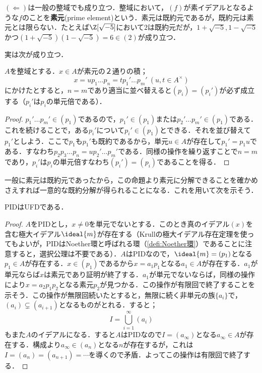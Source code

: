 $(\Longleftarrow)$は一般の整域でも成り立つ．整域において，$(f)$が素イデアルとなるような$f$のことを\textbf{素元}(prime element)という．素元は既約元であるが，既約元は素元とは限らない．たとえば$\Z[\sqrt{-5}]$において$2$は既約元だが，$1+\sqrt{-5},1-\sqrt{-5}$かつ$(1+\sqrt{-5})(1-\sqrt{-5})=6\in (2)$が成り立つ．

実は次が成り立つ．
\begin{prop}
	$A$を整域とする．$x\in A$が素元の２通りの積；
	\[x=up_1\dots p_n=tp_1'\dots p_m'~(u,t\in A^\times)\]
	にかけたとすると，$n=m$であり適当に並べ替えると$(p_i)=(p_i')$が必ず成立する（$p_i'$は$p_i$の単元倍である）．
\end{prop}

\begin{proof}
	$p_1'\dots p_m'\in (p_1)$であるので，$p_1'\in (p_1)$または$p_2'\dots p_m'\in (p_1)$である．これを続けることで，ある$p_i'$について$p_i'\in (p_1)$とできる．それを並び替えて$p_1'$としよう．ここで$p_1$も$p_1'$も既約であるから，単元$u\in A$が存在して$p_1'=p_1u$である．すなわち$p_2p_3\dots p_n=up_2'\dots p_m'$である．同様の操作を繰り返すことで$n=m$であり，$p_i'$は$p_i$の単元倍すなわち$(p_i')=(p_i)$であることを得る．
\end{proof}

一般に素元は既約元であったから，この命題より素元に分解できることを確かめさえすれば一意的な既約分解が得られることになる．これを用いて次を示そう．
\begin{thm}
	PIDはUFDである．
\end{thm}

\begin{proof}
	$A$をPIDとし，$x\neq0$を単元でないとする．このとき真のイデアル$(x)$を含む極大イデアル$\ideal{m}$が存在する（Krullの極大イデアル存在定理を使ってもよいが，PIDはNoether環と呼ばれる環（\ref{defi:Noether環}）であることに注意すると，選択公理は不要である）．$A$はPIDなので，$\ideal{m}=(p_1)$となる$p_1\in A$が存在する．$x\in(p_1)$であるから$x=a_1p_1$となる$a_1\in A$が存在する．$a_1$が単元ならば$x$は素元であり証明が終了する．$a_1$が単元でないならば，同様の操作により$x=a_2p_1p_2$となる素元$p_2$が見つかる．この操作が有限回で終了することを示そう．この操作が無限回続いたとすると，無限に続く非単元の族$\{a_i\}$で，$(a_i)\subsetneq (a_{i+1})$となるものがとれる．すると；
	\[I=\bigcup_{i=1}^\infty (a_i)\]
	もまた$A$のイデアルになる．すると$A$はPIDなので$I=(a_\infty)$となる$a_\infty\in A$が存在する．構成より$a_\infty\in (a_n)$となる$n$が存在するが，これは$I=(a_n)=(a_{n+1})=\cdots$を導くので矛盾．よってこの操作は有限回で終了する．
\end{proof}

